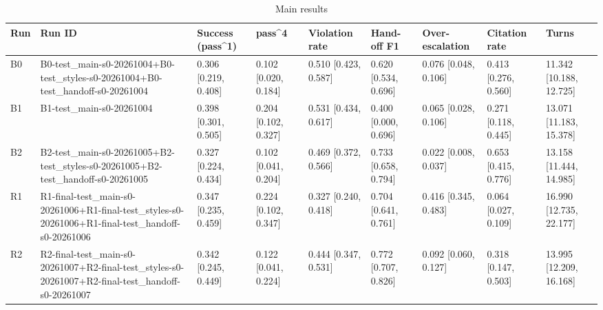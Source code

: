 \begin{table}[t]
\centering
\caption{Main results}
\begin{tabular}{lllllllll}
\hline
Run & Run ID & Success (pass\^{}1) & pass\^{}4 & Violation rate & Hand-off F1 & Over-escalation & Citation rate & Turns \\
\hline
B0 & B0-test\_main-s0-20261004+B0-test\_styles-s0-20261004+B0-test\_handoff-s0-20261004 & 0.306 [0.219, 0.408] & 0.102 [0.020, 0.184] & 0.510 [0.423, 0.587] & 0.620 [0.534, 0.696] & 0.076 [0.048, 0.106] & 0.413 [0.276, 0.560] & 11.342 [10.188, 12.725] \\
B1 & B1-test\_main-s0-20261004 & 0.398 [0.301, 0.505] & 0.204 [0.102, 0.327] & 0.531 [0.434, 0.617] & 0.400 [0.000, 0.696] & 0.065 [0.028, 0.106] & 0.271 [0.118, 0.445] & 13.071 [11.183, 15.378] \\
B2 & B2-test\_main-s0-20261005+B2-test\_styles-s0-20261005+B2-test\_handoff-s0-20261005 & 0.327 [0.224, 0.434] & 0.102 [0.041, 0.204] & 0.469 [0.372, 0.566] & 0.733 [0.658, 0.794] & 0.022 [0.008, 0.037] & 0.653 [0.415, 0.776] & 13.158 [11.444, 14.985] \\
R1 & R1-final-test\_main-s0-20261006+R1-final-test\_styles-s0-20261006+R1-final-test\_handoff-s0-20261006 & 0.347 [0.235, 0.459] & 0.224 [0.102, 0.347] & 0.327 [0.240, 0.418] & 0.704 [0.641, 0.761] & 0.416 [0.345, 0.483] & 0.064 [0.027, 0.109] & 16.990 [12.735, 22.177] \\
R2 & R2-final-test\_main-s0-20261007+R2-final-test\_styles-s0-20261007+R2-final-test\_handoff-s0-20261007 & 0.342 [0.245, 0.449] & 0.122 [0.041, 0.224] & 0.444 [0.347, 0.531] & 0.772 [0.707, 0.826] & 0.092 [0.060, 0.127] & 0.318 [0.147, 0.503] & 13.995 [12.209, 16.168] \\
\hline
\end{tabular}
\end{table}
